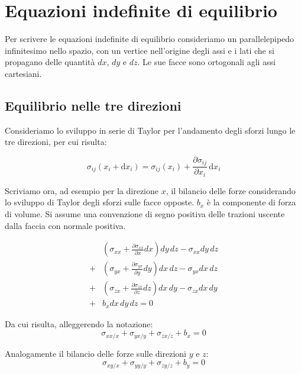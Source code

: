 \section{Equazioni indefinite di equilibrio}

Per scrivere le equazioni indefinite di equilibrio consideriamo un parallelepipedo infinitesimo nello spazio, con un vertice nell'origine degli assi e i lati che si propagano delle quantità $dx$, $dy$ e $dz$. Le sue facce sono ortogonali agli assi cartesiani.

\subsection*{Equilibrio nelle tre direzioni}
Consideriamo lo sviluppo in serie di Taylor per l'andamento degli sforzi lungo le tre direzioni, per cui risulta: 

\begin{equation*}
\sigma_{ij}(x_i + \mathrm{d}x_i) = \sigma_{ij}(x_i) + \frac{\partial \sigma_{ij}}{\partial x_i} \, \mathrm{d}x_i
\end{equation*}

Scriviamo ora, ad esempio per la direzione $x$, il bilancio delle forze considerando lo sviluppo di Taylor degli sforzi sulle facce opposte. $b_x$ è la componente di forza di volume. Si assume una convenzione di segno positiva delle trazioni uscente dalla faccia con normale positiva.

\begin{align*}
&(\sigma_{xx} + \frac{\partial \sigma_{xx}}{\partial x} dx) dy\, dz - \sigma_{xx} dy\, dz \\
+ &(\sigma_{yx} + \frac{\partial \sigma_{yx}}{\partial y} dy) dx\, dz - \sigma_{yx} dx\, dz \\
+ &(\sigma_{zx} + \frac{\partial \sigma_{zx}}{\partial z} dz) dx\, dy - \sigma_{zx} dx\, dy \\
+ &b_x dx\, dy\, dz = 0
\end{align*}

Da cui risulta, alleggerendo la notazione:
\begin{equation*}
\sigma_{xx/x}  + \sigma_{yx/y}  + \sigma_{zx/z}  + b_x = 0
\end{equation*}

Analogamente il bilancio delle forze sulle direzioni $y$ e $z$:
\begin{equation*}
\sigma_{xy/x}  + \sigma_{yy/y}  + \sigma_{zy/z}  + b_y = 0
\end{equation*}

